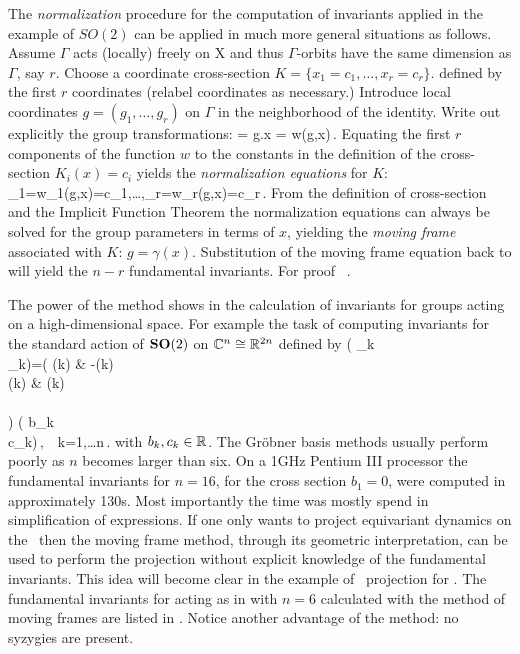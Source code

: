  The \emph{normalization} procedure for the computation of invariants applied in the example of $SO(2)$ can be applied
in much more general situations as follows. Assume $\Gamma$ acts (locally) freely on X and
thus $\Gamma$-orbits have the same dimension as $\Gamma$, say $r$. Choose a coordinate cross-section $K=\{x_1=c_1,\ldots,x_r=c_r\}$.
defined by the first $r$ coordinates (relabel coordinates as necessary.) Introduce local coordinates $g=(g_1,\ldots,g_r)$ on $\Gamma$ in
the neighborhood of the identity. Write out explicitly the group transformations:
\beq
	= g.x = w(g,x)\,.
	\label{eq:transNorm}
\eeq
Equating the first $r$ components of the function $w$ to the constants in the definition of the cross-section $K_i(x)=c_i$ yields the \emph{normalization equations} for $K$:
\beq
	_1=w_1(g,x)=c_1,\ldots,_r=w_r(g,x)=c_r\,.
	\label{eq:normalization}
\eeq
From the definition of cross-section and the Implicit Function Theorem the normalization equations  can always be solved for the group parameters in terms of $x$, yielding the \emph{moving frame} associated with $K$: $g=\gamma(x)$. Substitution
of the moving frame equation back to  will yield the $n-r$ fundamental invariants. For proof \cf~.

The power of the method shows in the calculation of invariants for groups acting on a high-dimensional space. For example the
task of computing invariants for the standard action of $\mathbf{SO}(2)$ on $\mathbb{C}^{n}\cong\mathbb{R}^{2n}$ defined by
\beq
	\left( _k \\ _k\earr \right)=\left(
			    			\cos(k\theta) & -\sin(k\theta)\\
						\sin(k\theta) & \cos(k\theta)\\
			   			\earr\\	
						\right) \left( b_k \\ c_k\earr\right)\,,\ \ k=1,\ldots n\,.
	\label{eq:SO2stand}
\eeq
with $b_k,c_k\in\mathbb{R}^{}$. The Gr\"{o}bner basis methods usually perform poorly as $n$ becomes larger than six. On a 1GHz Pentium III processor the fundamental invariants for $n=16$, for the cross
section $b_1=0$, were computed in approximately 130s. Most importantly the time was mostly
spend in simplification of expressions.
If one only wants to project equivariant dynamics on the \reducedsp\ then the moving frame method,
through its geometric interpretation, can be used to perform the projection without explicit knowledge of the fundamental invariants.
This idea will become clear in the example of \reducedsp\ projection
for \CLe. The fundamental invariants for  acting as in  with
$n=6$ calculated with the method of moving frames are listed in . Notice another advantage of the method: no syzygies are present.

